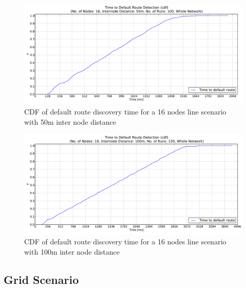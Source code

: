 \begin{figure}[htbp]
  \begin{center}
    \leavevmode
      \includegraphics[width=\textwidth]
      {Pics/results/16/MRHOF/line/dist50_montecarlo_cdf_hist.pdf}
   \caption{CDF of default route discovery time for a 16 nodes line scenario with 50m inter node distance}
   \label{fig:16_MRHOF_line_50_cdf}
  \end{center}
\end{figure}

\begin{figure}[htbp]
  \begin{center}
    \leavevmode
      \includegraphics[width=\textwidth]
      {Pics/results/16/MRHOF/line/dist100_montecarlo_cdf_hist.pdf}
   \caption{CDF of default route discovery time for a 16 nodes line scenario with 100m inter node distance}
   \label{fig:16_MRHOF_line_100_cdf}
  \end{center}
\end{figure}


\subsection{Grid Scenario}
\label{Appx:cdf:grid}

